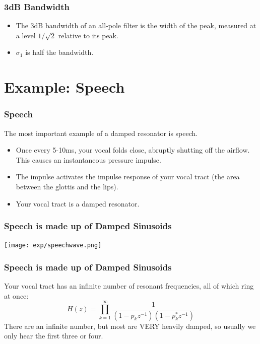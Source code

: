 \documentclass{beamer}
\begin{document}
\begin{frame}
  \frametitle{3dB Bandwidth}

  \begin{itemize}
  \item The 3dB bandwidth of an all-pole filter is the width of the peak,
    measured at a level $1/\sqrt{2}$ relative to its peak.
  \item $\sigma_1$ is half the bandwidth.
  \end{itemize}
\end{frame}  

\section[Speech]{Example: Speech}
\setcounter{subsection}{1}

\begin{frame}
  \frametitle{Speech}

  The most important example of a damped resonator is speech.
  \begin{itemize}
  \item Once every 5-10ms, your vocal folds close, abruptly shutting
    off the airflow.  This causes an instantaneous pressure impulse.
  \item The impulse activates the impulse response of your vocal tract
    (the area between the glottis and the lips).
  \item Your vocal tract is a damped resonator.
  \end{itemize}
\end{frame}

\begin{frame}
  \frametitle{Speech is made up of Damped Sinusoids}

  \centerline{\texttt{[image: exp/speechwave.png]}}
\end{frame}

\begin{frame}
  \frametitle{Speech is made up of Damped Sinusoids}

  Your vocal tract has an infinite number of resonant frequencies, all
  of which ring at once:
  \[
  H(z)  = \prod_{k=1}^\infty \frac{1}{(1-p_kz^{-1})(1-p_k^*z^{-1})}
  \]
  There are an infinite number, but most are VERY heavily damped, so
  usually we only hear the first three or four.
\end{frame}
\end{document}
